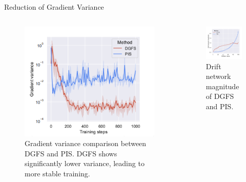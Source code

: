 \documentclass[aspectratio=169,xcolor=dvipsnames]{beamer}
\begin{document}
\begin{frame}[t]{Reduction of Gradient Variance}
\footnotesize

\vspace{-0.75cm}
\begin{columns}[t]
\begin{column}{0.35\textwidth}
\begin{figure}
    \centering
    \includegraphics[width=\textwidth]{figures/grad_variance.png}
    \caption{Gradient variance comparison between DGFS and PIS. DGFS shows significantly lower variance, leading to more stable training.}
\end{figure}
\end{column}
\begin{column}{0.35\textwidth}
\begin{figure}
    \centering
    \includegraphics[width=\textwidth]{figures/drift.png}
    \caption{Drift network magnitude of DGFS and PIS.}
\end{figure}
\end{column}
\end{columns}


\end{frame}
\end{document}

